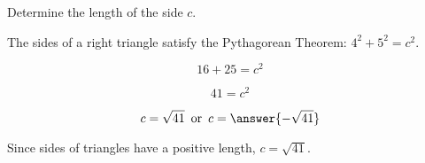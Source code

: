 \documentclass{ximera}
\begin{document}
\begin{example}


Determine the length of the side $c$. 






\begin{image}[3in]
  \end{image}



\begin{explanation}

The sides of a right triangle satisfy the Pythagorean Theorem: $4^2 + 5^2 = c^2$.


\[  16 + 25 = c^2       \]

\[  41 = c^2     \]

\[  c = \sqrt{41} \, \text{ or } \, c = \answer{-\sqrt{41}}    \]



Since sides of triangles have a positive length, $c = \sqrt{41}$.



\end{explanation}




\end{example}
\end{document}
